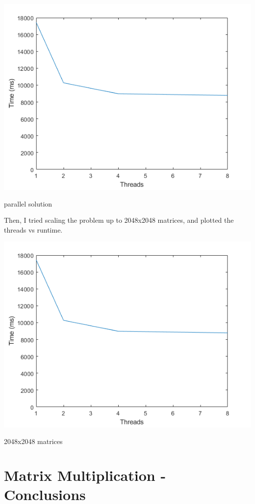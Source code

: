 \documentclass[a4paper]{article}
\begin{document}
\begin{center}
    \includegraphics[scale=1]{3a.png}
    \caption{parallel solution}
\end{center}

\noindent
Then, I tried scaling the problem up to 2048x2048 matrices, and plotted the threads vs runtime.

\begin{center}
    \includegraphics[scale=1]{3a.png}
    \caption{2048x2048 matrices}
\end{center}

\section{Matrix Multiplication - Conclusions}
\end{document}
